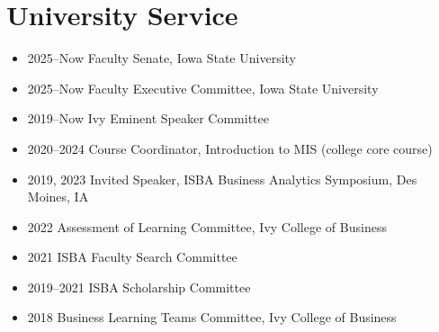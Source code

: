 \documentclass[paper=letter,fontsize=10pt]{scrartcl} %
\newcommand{\NewPart}[2]{\section*{{#1} #2}}
\begin{document}
\NewPart{University Service}{}
\begin{itemize}
\item 2025--Now \hspace{0.3em} Faculty Senate, Iowa State University 
\item 2025--Now \hspace{0.3em} Faculty Executive Committee, Iowa State University 
\item 2019--Now \hspace{0.3em} Ivy Eminent Speaker Committee
\item 2020--2024 \hspace{0.3em} Course Coordinator, Introduction to MIS (college core course)
\item 2019, 2023 \hspace{0.3em} Invited Speaker, ISBA Business Analytics Symposium, Des Moines, IA
\item 2022 \hspace{0.3em} Assessment of Learning Committee, Ivy College of Business
\item 2021 \hspace{0.3em} ISBA Faculty Search Committee
\item 2019--2021 \hspace{0.3em} ISBA Scholarship Committee
\item 2018 \hspace{0.3em} Business Learning Teams Committee, Ivy College of Business
\end{itemize}

\end{document}
